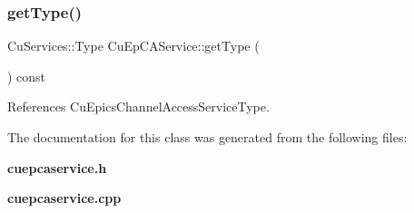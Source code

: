 \mbox{\label{classCuEpCAService_a6ad34e2bf4b442b315cded512d611cf3}} 
\subsubsection{get\+Type()}
{\footnotesize\ttfamily Cu\+Services\+::\+Type Cu\+Ep\+C\+A\+Service\+::get\+Type (\begin{DoxyParamCaption}{ }\end{DoxyParamCaption}) const}



References Cu\+Epics\+Channel\+Access\+Service\+Type.



The documentation for this class was generated from the following files\+:\begin{DoxyCompactItemize}
\item 
\textbf{ cuepcaservice.\+h}\item 
\textbf{ cuepcaservice.\+cpp}\end{DoxyCompactItemize}
